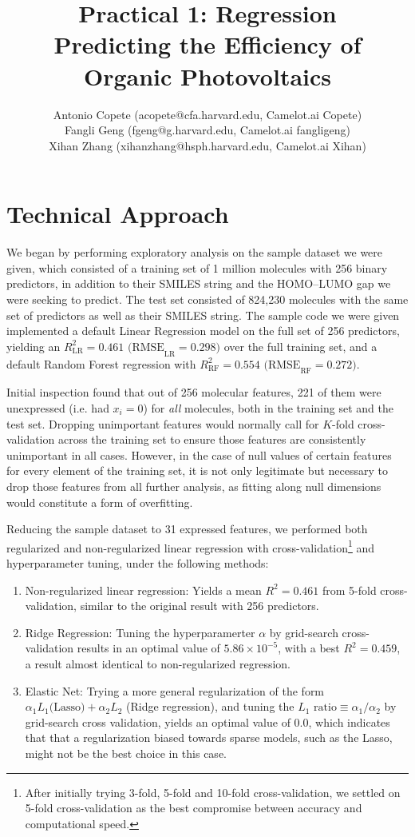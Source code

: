 \documentclass[11pt]{article}
\title{Practical 1: Regression \\ Predicting the Efficiency of Organic Photovoltaics}
\author{Antonio Copete (acopete@cfa.harvard.edu, Camelot.ai Copete) \\
	Fangli Geng (fgeng@g.harvard.edu, Camelot.ai fangligeng) \\
	Xihan Zhang (xihanzhang@hsph.harvard.edu, Camelot.ai Xihan)}
\begin{document}
\maketitle{}


\section{Technical Approach}

We began by performing exploratory analysis on the sample dataset we were given, which consisted of a training set of 1 million molecules with 256 binary predictors, in addition to their SMILES string and the HOMO--LUMO gap we were seeking to predict. The test set consisted of 824,230 molecules with the same set of predictors as well as their SMILES string. The sample code we were given implemented a default Linear Regression model on the full set of 256 predictors, yielding an $R_\textrm{LR}^2 = 0.461 \textrm{ (RMSE}_\textrm{LR} = 0.298)$ over the full training set, and a default Random Forest regression with $R_\textrm{RF}^2 = 0.554 \textrm{ (RMSE}_\textrm{RF} = 0.272)$.

Initial inspection found that out of 256 molecular features, 221 of them were unexpressed (i.e. had $x_i = 0$) for \emph{all} molecules, both in the training set and the test set. Dropping unimportant features would normally call for $K$-fold cross-validation across the training set to ensure those features are consistently unimportant in all cases. However, in the case of null values of certain features for every element of the training set, it is not only legitimate but necessary to drop those features from all further analysis, as fitting along null dimensions would constitute a form of overfitting.

Reducing the sample dataset to 31 expressed features, we performed both regularized and non-regularized linear regression with cross-validation\footnote{After initially trying 3-fold, 5-fold and 10-fold cross-validation, we settled on 5-fold cross-validation as the best compromise between accuracy and computational speed.} and hyperparameter tuning, under the following methods:

\begin{enumerate}

\item Non-regularized linear regression: Yields a mean $R^2 = 0.461$ from 5-fold cross-validation, similar to the original result with 256 predictors.
\item Ridge Regression: Tuning the hyperparamerter $\alpha$ by grid-search cross-validation results in an optimal value of $5.86 \times 10^{-5}$, with a best $R^2 = 0.459$, a result almost identical to non-regularized regression. 
\item Elastic Net: Trying a more general regularization of the form $\alpha_1 L_1 \textrm{(Lasso)} + \alpha_2 L_2$ (Ridge regression), and tuning the $L_1 \textrm{ ratio} \equiv \alpha_1/\alpha_2$ by grid-search cross validation, yields an optimal value of 0.0, which indicates that that a regularization biased towards sparse models, such as the Lasso, might not be the best choice in this case.

\end{enumerate}
\end{document}
